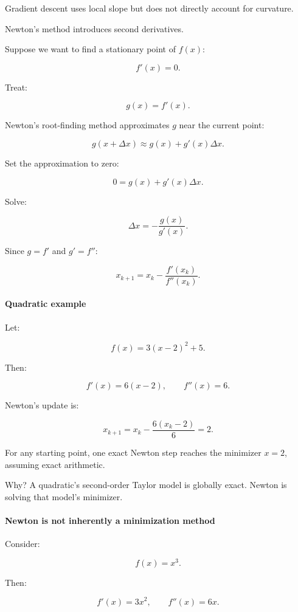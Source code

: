 Gradient descent uses local slope but does not directly account for curvature.

Newton's method introduces second derivatives.

Suppose we want to find a stationary point of \(f(x)\):

\[
f'(x)=0.
\]

Treat:

\[
g(x)=f'(x).
\]

Newton's root-finding method approximates \(g\) near the current point:

\[
g(x+\Delta x) \approx g(x)+g'(x)\Delta x.
\]

Set the approximation to zero:

\[
0=g(x)+g'(x)\Delta x.
\]

Solve:

\[
\Delta x=-\frac{g(x)}{g'(x)}.
\]

Since \(g=f'\) and \(g'=f''\):

\[
\boxed{ x_{k+1} = x_k-\frac{f'(x_k)}{f''(x_k)} }.
\]

\paragraph{Quadratic example}\label{02-foundations-ii-ch026-quadratic-example}

Let:

\[
f(x)=3(x-2)^2+5.
\]

Then:

\[
f'(x)=6(x-2), \qquad f''(x)=6.
\]

Newton's update is:

\[
x_{k+1} = x_k-\frac{6(x_k-2)}6 =2.
\]

For any starting point, one exact Newton step reaches the minimizer \(x=2\), assuming exact arithmetic.

Why? A quadratic's second-order Taylor model is globally exact. Newton is solving that model's minimizer.

\paragraph{Newton is not inherently a minimization method}\label{02-foundations-ii-ch026-newton-is-not-inherently-a-minimization-method}

Consider:

\[
f(x)=x^3.
\]

Then:

\[
f'(x)=3x^2,\qquad f''(x)=6x.
\]

